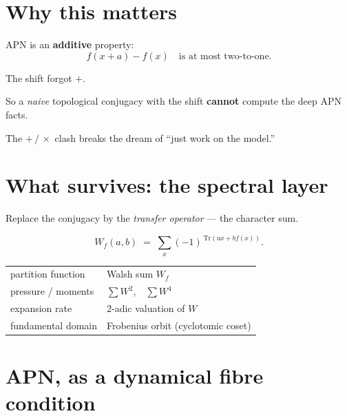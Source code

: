 \documentclass[11pt]{article}
\begin{document}
\section{Why this matters}

\bigskip

APN is an \textbf{additive} property:
\[
  f(x+a) - f(x) \quad\text{is at most two-to-one.}
\]

\bigskip

The shift forgot $+$.

\bigskip

So a \emph{naive} topological conjugacy with the shift
\textbf{cannot} compute the deep APN facts.

\bigskip

The $+\,/\,\times$ clash breaks the dream of ``just work on the model.''

\bigskip


\newpage


\section{What survives: the spectral layer}

\bigskip

Replace the conjugacy by the \emph{transfer operator} --- the character sum.

\bigskip

\[
  W_f(a,b) \;=\; \sum_{x} (-1)^{\,\mathrm{Tr}(a x + b f(x))} .
\]

\bigskip

\begin{center}
\begin{tabular}{ll}
partition function & Walsh sum $W_f$\\[4pt]
pressure / moments & $\sum W^{2}$,\ \ $\sum W^{4}$\\[4pt]
expansion rate & $2$-adic valuation of $W$\\[4pt]
fundamental domain & Frobenius orbit (cyclotomic coset)\\
\end{tabular}
\end{center}

\bigskip


\newpage


\section{APN, as a dynamical fibre condition}
\end{document}
